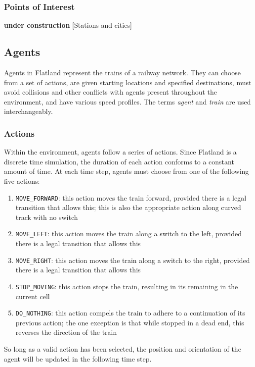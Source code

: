 \documentclass[11pt]{article}
\newcommand{\code}[1]{\colorbox{light-gray}{\texttt{#1}}}
\begin{document}
\subsubsection{Points of Interest}
\textbf{under construction} [Stations and cities]


\subsection{Agents}
\label{sec:Agents}
Agents in Flatland represent the trains of a railway network.  They can choose from a set of actions, are given starting locations and specified destinations, must avoid collisions and other conflicts with agents present throughout the environment, and have various speed profiles.  The terms \textit{agent} and \textit{train} are used interchangeably.

\subsubsection{Actions}
\label{sec:Actions}
Within the environment, agents follow a series of actions.  Since Flatland is a discrete time simulation, the duration of each action conforms to a constant amount of time.    At each time step, agents must choose from one of the following five actions: 
\begin{enumerate}
  \item \code{MOVE\_FORWARD}: this action moves the train forward, provided there is a legal transition that allows this; this is also the appropriate action along curved track with no switch
  \item \code{MOVE\_LEFT}: this action moves the train along a switch to the left, provided there is a legal transition that allows this
  \item \code{MOVE\_RIGHT}: this action moves the train along a switch to the right, provided there is a legal transition that allows this
  \item \code{STOP\_MOVING}: this action stops the train, resulting in its remaining in the current cell
  \item\code{{DO\_NOTHING}}: this action compels the train to adhere to a continuation of its previous action; the one exception is that while stopped in a dead end, this reverses the direction of the train
\end{enumerate} \smallskip

\noindent So long as a valid action has been selected, the position and orientation of the agent will be updated in the following time step. \medskip
\end{document}

